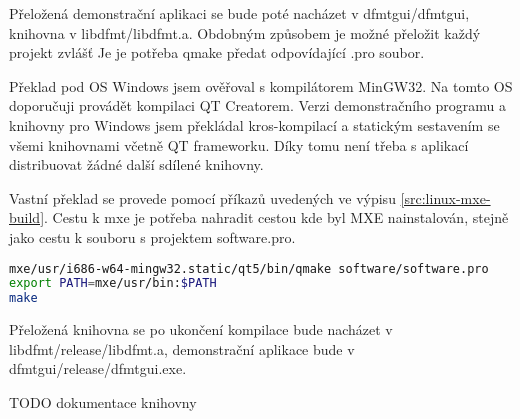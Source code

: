 Přeložená demonstrační aplikaci se bude poté nacházet v dfmtgui/dfmtgui, knihovna v libdfmt/libdfmt.a. Obdobným způsobem je možné přeložit každý projekt zvlášť Je je potřeba qmake předat odpovídající .pro soubor.

Překlad pod OS Windows jsem ověřoval s kompilátorem MinGW32. Na tomto OS doporučuji provádět kompilaci QT Creatorem. Verzi demonstračního programu a knihovny pro Windows jsem překládal kros-kompilací a statickým sestavením se všemi knihovnami včetně QT frameworku. Díky tomu není třeba s aplikací distribuovat žádné další sdílené knihovny.


Vastní překlad se provede pomocí příkazů uvedených ve výpisu \ref{src:linux-mxe-build}. Cestu k mxe je potřeba nahradit cestou kde byl MXE nainstalován, stejně jako cestu k souboru s projektem software.pro.

\begin{lstlisting}[language=bash, label=src:linux-mxe-build, caption=Překlad pod OS Linux pro OS Windows.]
mxe/usr/i686-w64-mingw32.static/qt5/bin/qmake software/software.pro
export PATH=mxe/usr/bin:$PATH
make
\end{lstlisting}

Přeložená knihovna se po ukončení kompilace bude nacházet v libdfmt/release/libdfmt.a, demonstrační aplikace bude v dfmtgui/release/dfmtgui.exe.


TODO dokumentace knihovny